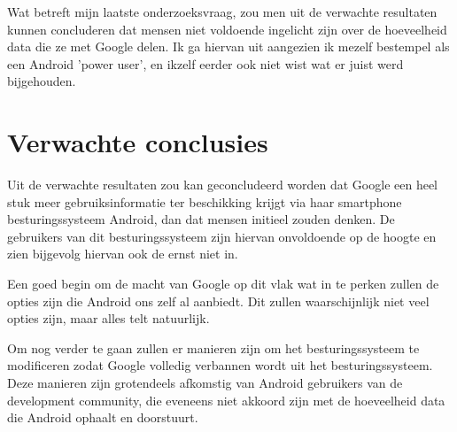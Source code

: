 \noindent Wat betreft mijn laatste onderzoeksvraag, zou men uit de verwachte resultaten kunnen concluderen dat mensen niet voldoende ingelicht zijn over de hoeveelheid data die ze met Google delen. Ik ga hiervan uit aangezien ik mezelf bestempel als een Android 'power user', en ikzelf eerder ook niet wist wat er juist werd bijgehouden.


\section{Verwachte conclusies}
\label{sec:verwachte_conclusies}


Uit de verwachte resultaten zou kan geconcludeerd worden dat Google een heel stuk meer gebruiksinformatie ter beschikking krijgt via haar smartphone besturingssysteem Android, dan dat mensen initieel zouden denken. De gebruikers van dit besturingssysteem zijn hiervan onvoldoende op de hoogte en zien bijgevolg hiervan ook de ernst niet in.

\vspace{3mm}

\noindent Een goed begin om de macht van Google op dit vlak wat in te perken zullen de opties zijn die Android ons zelf al aanbiedt. Dit zullen waarschijnlijk niet veel opties zijn, maar alles telt natuurlijk. 

\vspace{3mm}

\noindent Om nog verder te gaan zullen er manieren zijn om het besturingssysteem te modificeren zodat Google volledig verbannen wordt uit het besturingssysteem. Deze manieren zijn grotendeels afkomstig van Android gebruikers van de development community, die eveneens niet akkoord zijn met de hoeveelheid data die Android ophaalt en doorstuurt.


